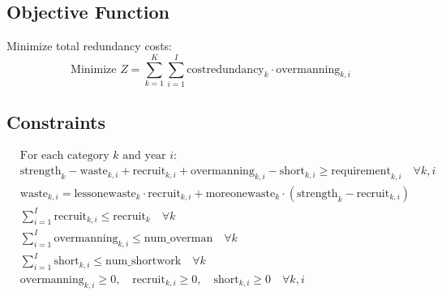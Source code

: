 \documentclass{article}
\begin{document}
\subsection*{Objective Function}
Minimize total redundancy costs:
\[
\text{Minimize } Z = \sum_{k=1}^{K} \sum_{i=1}^{I} \text{costredundancy}_{k} \cdot \text{overmanning}_{k,i}
\]

\subsection*{Constraints}
\begin{align*}
& \text{For each category } k \text{ and year } i: \\
& \text{strength}_{k} - \text{waste}_{k,i} + \text{recruit}_{k,i} + \text{overmanning}_{k,i} - \text{short}_{k,i} \geq \text{requirement}_{k,i} \quad \forall k, i \\
& \text{waste}_{k,i} = \text{lessonewaste}_{k} \cdot \text{recruit}_{k,i} +  \text{moreonewaste}_{k} \cdot (\text{strength}_{k} - \text{recruit}_{k,i}) \\
& \sum_{i=1}^{I} \text{recruit}_{k,i} \leq \text{recruit}_{k} \quad \forall k \\
& \sum_{i=1}^{I} \text{overmanning}_{k,i} \leq \text{num\_overman} \quad \forall k \\
& \sum_{i=1}^{I} \text{short}_{k,i} \leq \text{num\_shortwork} \quad \forall k \\
& \text{overmanning}_{k,i} \geq 0, \quad \text{recruit}_{k,i} \geq 0, \quad \text{short}_{k,i} \geq 0 \quad \forall k, i \\
\end{align*}
\end{document}
